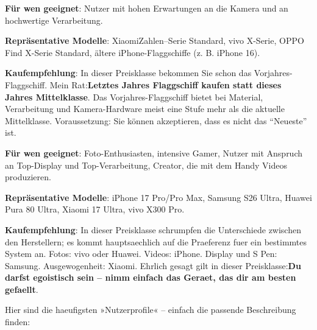 \textbf{Für wen geeignet}: Nutzer mit hohen Erwartungen an die Kamera und an hochwertige Verarbeitung.

\textbf{Repräsentative Modelle}: XiaomiZahlen--Serie Standard, vivo X-Serie, OPPO Find X-Serie Standard, ältere iPhone-Flaggschiffe (z. B. iPhone 16).

\textbf{Kaufempfehlung}: In dieser Preisklasse bekommen Sie schon das Vorjahres-Flaggschiff. Mein Rat:\textbf{Letztes Jahres Flaggschiff kaufen statt dieses Jahres Mittelklasse}. Das Vorjahres-Flaggschiff bietet bei Material, Verarbeitung und Kamera-Hardware meist eine Stufe mehr als die aktuelle Mittelklasse. Voraussetzung: Sie können akzeptieren, dass es nicht das “Neueste” ist.


\textbf{Für wen geeignet}: Foto-Enthusiasten, intensive Gamer, Nutzer mit Anspruch an Top-Display und Top-Verarbeitung, Creator, die mit dem Handy Videos produzieren.

\textbf{Repräsentative Modelle}: iPhone 17 Pro/Pro Max, Samsung S26 Ultra, Huawei Pura 80 Ultra, Xiaomi 17 Ultra, vivo X300 Pro.

\textbf{Kaufempfehlung}: In dieser Preisklasse schrumpfen die Unterschiede zwischen den Herstellern; es kommt hauptsaechlich auf die Praeferenz fuer ein bestimmtes System an. Fotos: vivo oder Huawei. Videos: iPhone. Display und S Pen: Samsung. Ausgewogenheit: Xiaomi. Ehrlich gesagt gilt in dieser Preisklasse:\textbf{Du darfst egoistisch sein – nimm einfach das Geraet, das dir am besten gefaellt}.


Hier sind die haeufigsten »Nutzerprofile« – einfach die passende Beschreibung finden:

